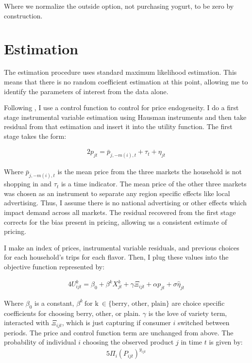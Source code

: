 \documentclass[11pt]{article}
\theoremstyle{definition}
\theoremstyle{remark}
\begin{document}
    Where we normalize the outside option, not purchasing yogurt, to be zero by construction. 

\section{Estimation}

The estimation procedure uses standard maximum likelihood estimation. This means that there is no random coefficient estimation at this point, allowing me to identify the parameters of interest from the data alone.

Following \citet{petrin_control_2010}, I use a control function to control for price endogeneity. I do a first stage instrumental variable estimation using Hausman instruments and then take residual from that estimation and insert it into the utility function. The first stage takes the form:

    \begin{alignat*}{2}
      p_{jt} = \bar{p}_{j,-m(i),t} + \tau_t + \eta_{jt}
    \end{alignat*}

    Where $\bar{p}_{j,-m(i),t}$ is the mean price from the three markets the household is not shopping in and $\tau_t$ is a time indicator. The mean price of the other three markets was chosen as an instrument to separate any region specific effects like local advertising. Thus, I assume there is no national advertising or other effects which impact demand across all markets. The residual recovered from the first stage corrects for the bias present in pricing, allowing us a consistent estimate of pricing.

I make an index of prices, instrumental variable residuals, and previous choices for each household's trips for each flavor. Then, I plug these values into the objective function represented by:

\begin{alignat*}{4}
  U^k_{ijt} = \beta_0 +  \beta^kX^k_{jt} + \gamma\Xi_{ijt} + \alpha p_{jt} + \sigma\hat{\eta}_{jt}
\end{alignat*}

Where $\beta_0$ is a constant, $\beta^k \ \text{for k} \ \in \{\text{berry, other, plain}\}$ are choice specific coefficients for choosing berry, other, or plain. $\gamma$ is the love of variety term, interacted with $\Xi_{ijt}$, which is just capturing if consumer $i$ switched between periods. The price and control function term are unchanged from above. The probability of individual $i$ choosing the observed product $j$ in time $t$ is given by:
\begin{alignat*}{5}
  \Pi_i(P_{ijt})^{y_{ijt}}
\end{alignat*}
\end{document}
